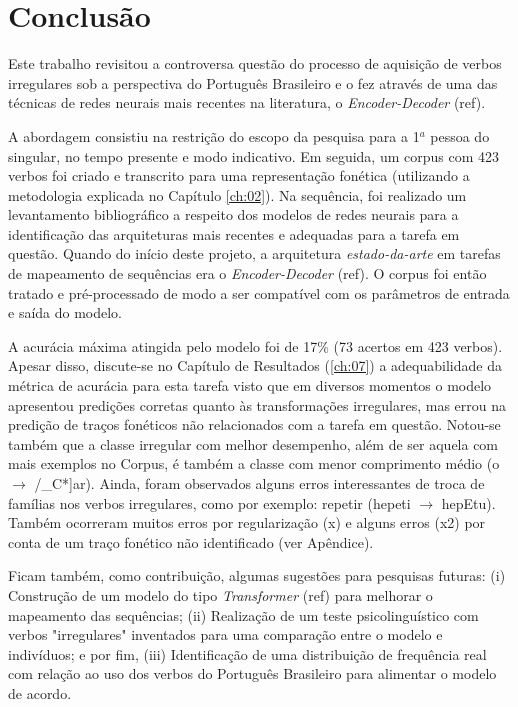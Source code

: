 \chapter{Conclusão}
\label{ch:08}

Este trabalho revisitou a controversa questão do processo de aquisição de verbos irregulares sob a perspectiva do Português Brasileiro e o fez através de uma das técnicas de redes neurais mais recentes na literatura, o \textit{Encoder-Decoder} (ref). 

A abordagem consistiu na restrição do escopo da pesquisa para a 1$^{a}$ pessoa do singular, no tempo presente e modo indicativo. Em seguida, um corpus com 423 verbos foi criado e transcrito para uma representação fonética (utilizando a metodologia explicada no Capítulo \ref{ch:02}). Na sequência, foi realizado um levantamento bibliográfico a respeito dos modelos de redes neurais para a identificação das arquiteturas mais recentes e adequadas para a tarefa em questão. Quando do início deste projeto, a arquitetura \textit{estado-da-arte} em tarefas de mapeamento de sequências era o \textit{Encoder-Decoder} (ref). O corpus foi então tratado e pré-processado de modo a ser compatível com os parâmetros de entrada e saída do modelo. 

A acurácia máxima atingida pelo modelo foi de 17\% (73 acertos em 423 verbos). Apesar disso, discute-se no Capítulo de Resultados (\ref{ch:07}) a adequabilidade da métrica de acurácia para esta tarefa visto que em diversos momentos o modelo apresentou predições corretas quanto às transformações irregulares, mas errou na predição de traços fonéticos não relacionados com a tarefa em questão. Notou-se também que a classe irregular com melhor desempenho, além de ser aquela com mais exemplos no Corpus, é também a classe com menor comprimento médio (o $\rightarrow$ \textopeno/\_C*]ar). Ainda, foram observados alguns erros interessantes de troca de famílias nos verbos irregulares, como por exemplo: repetir (hepeti $\rightarrow$ hepEtu). Também ocorreram muitos erros por regularização (x) e alguns erros (x2) por conta de um traço fonético não identificado (ver Apêndice). 

Ficam também, como contribuição, algumas sugestões para pesquisas futuras: (i) Construção de um modelo do tipo \textit{Transformer} (ref) para melhorar o mapeamento das sequências; (ii) Realização de um teste psicolinguístico com verbos "irregulares" inventados para uma comparação entre o modelo e indivíduos; e por fim, (iii) Identificação de uma distribuição de frequência real com relação ao uso dos verbos do Português Brasileiro para alimentar o modelo de acordo. 

